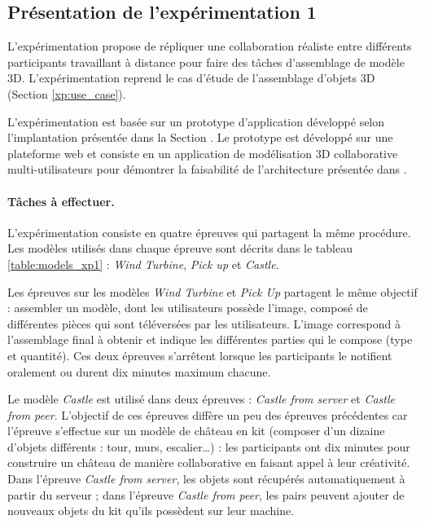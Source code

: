 
\subsection{Présentation de l'expérimentation 1}

L'expérimentation propose de répliquer une collaboration réaliste entre 
différents participants travaillant à distance pour faire des tâches d'assemblage de 
modèle 3D. L'expérimentation reprend le cas d'étude de l'assemblage d'objets 3D 
(Section \ref{xp:use_case}). 

L'expérimentation est basée sur un prototype d'application développé selon 
l'implantation présentée dans la Section .
Le prototype est développé sur une plateforme web et consiste en un application 
de modélisation 3D collaborative multi-utilisateurs pour démontrer la faisabilité de 
l'architecture présentée dans . 


\paragraph{Tâches à effectuer.}
L'expérimentation consiste en quatre épreuves qui partagent la même procédure.
Les modèles utilisés dans chaque épreuve sont décrits dans le tableau 
\ref{table:models_xp1} : \textit{Wind Turbine}, \textit{Pick up} et \textit{Castle}. 

Les épreuves sur les modèles \textit{Wind Turbine} et \textit{Pick Up} partagent le 
même objectif : 
assembler un modèle, dont les utilisateurs possède l'image, composé de 
différentes pièces qui sont téléversées par les utilisateurs. L'image correspond à 
l'assemblage final à obtenir et indique les différentes parties qui le 
compose (type et quantité). Ces deux épreuves s'arrêtent lorsque les participants 
le notifient oralement ou durent dix minutes maximum chacune.

Le modèle \textit{Castle} est utilisé dans deux épreuves : 
\textit{Castle from server} et \textit{Castle from peer}. L'objectif de ces épreuves
diffère un peu des épreuves précédentes car l'épreuve s'effectue sur un  modèle 
de château en kit (composer d'un dizaine d'objets différents : tour, murs, 
escalier\dots) : les 
participants ont dix minutes pour construire un 
château de manière collaborative en faisant appel à leur créativité. 
Dans l'épreuve \textit{Castle from server}, les objets sont récupérés 
automatiquement à partir du serveur ; 
dans l'épreuve \textit{Castle from peer}, les pairs peuvent ajouter de nouveaux 
objets du kit qu'ils possèdent sur leur machine.

